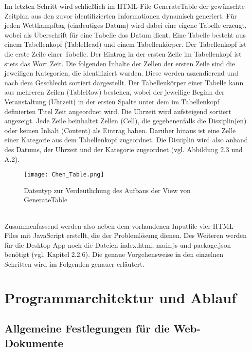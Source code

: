 Im letzten Schritt wird schließlich im HTML-File GenerateTable der gewünschte Zeitplan aus den zuvor identifizierten Informationen dynamisch generiert. Für jeden Wettkampftag (eindeutiges Datum) wird dabei eine eigene Tabelle erzeugt, wobei als Überschrift für eine Tabelle das Datum dient. 
Eine Tabelle besteht aus einem Tabellenkopf (TableHead) und einem Tabellenkörper. Der Tabellenkopf ist die erste Zeile einer Tabelle. Der Eintrag in der ersten Zelle im Tabellenkopf ist stets das Wort Zeit. Die folgenden Inhalte der Zellen der ersten Zeile sind die jeweiligen Kategorien, die identifiziert wurden. Diese werden aszendierend und nach dem Geschlecht sortiert dargestellt. 
Der Tabellenkörper einer Tabelle kann aus mehreren Zeilen (TableRow) bestehen, wobei der jeweilige Beginn der Veranstaltung (Uhrzeit) in der ersten Spalte unter dem im Tabellenkopf definierten Titel Zeit angeordnet wird. Die Uhrzeit wird aufsteigend sortiert angezeigt. Jede Zeile beinhaltet Zellen (Cell), die gegebenenfalls die Disziplin(en) oder keinen Inhalt (Content) als Eintrag haben. Darüber hinaus ist eine Zelle einer Kategorie aus dem Tabellenkopf zugeordnet. Die Disziplin wird also anhand des Datums, der Uhrzeit und der Kategorie zugeordnet (vgl. Abbildung 2.3 und A.2).
\begin{figure}[htbp]
  \centering
  \texttt{[image: Chen\_Table.png]}
  \caption{Datentyp zur Verdeutlichung des Aufbaus der View von GenerateTable}
  \label{fig:Fig1}
\end{figure} \\
Zusammenfassend werden also neben dem vorhandenen Inputfile vier HTML-Files mit JavaScript erstellt, die der Problemlösung dienen. Des Weiteren werden für die Desktop-App noch die Dateien index.html, main.js und package.json benötigt (vgl. Kapitel 2.2.6). Die genaue Vorgehensweise in den einzelnen Schritten wird im Folgenden genauer erläutert.

\section{Programmarchitektur und Ablauf}

\subsection{Allgemeine Festlegungen für die Web-Dokumente}

